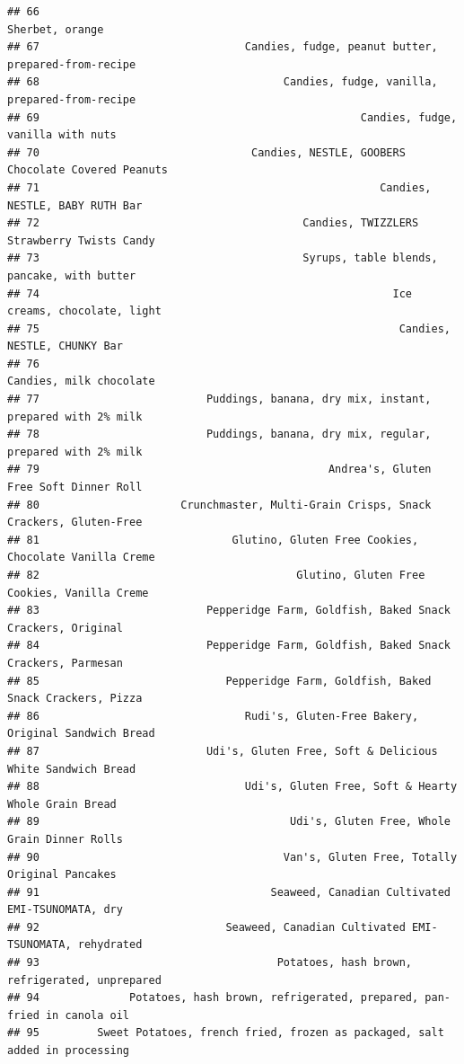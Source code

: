 \documentclass[
]{article}
\begin{document}
\begin{verbatim}
## 66                                                                    Sherbet, orange
## 67                                Candies, fudge, peanut butter, prepared-from-recipe
## 68                                      Candies, fudge, vanilla, prepared-from-recipe
## 69                                                  Candies, fudge, vanilla with nuts
## 70                                 Candies, NESTLE, GOOBERS Chocolate Covered Peanuts
## 71                                                     Candies, NESTLE, BABY RUTH Bar
## 72                                         Candies, TWIZZLERS Strawberry Twists Candy
## 73                                         Syrups, table blends, pancake, with butter
## 74                                                       Ice creams, chocolate, light
## 75                                                        Candies, NESTLE, CHUNKY Bar
## 76                                                            Candies, milk chocolate
## 77                          Puddings, banana, dry mix, instant, prepared with 2% milk
## 78                          Puddings, banana, dry mix, regular, prepared with 2% milk
## 79                                             Andrea's, Gluten Free Soft Dinner Roll
## 80                      Crunchmaster, Multi-Grain Crisps, Snack Crackers, Gluten-Free
## 81                              Glutino, Gluten Free Cookies, Chocolate Vanilla Creme
## 82                                        Glutino, Gluten Free Cookies, Vanilla Creme
## 83                          Pepperidge Farm, Goldfish, Baked Snack Crackers, Original
## 84                          Pepperidge Farm, Goldfish, Baked Snack Crackers, Parmesan
## 85                             Pepperidge Farm, Goldfish, Baked Snack Crackers, Pizza
## 86                                Rudi's, Gluten-Free Bakery, Original Sandwich Bread
## 87                          Udi's, Gluten Free, Soft & Delicious White Sandwich Bread
## 88                                Udi's, Gluten Free, Soft & Hearty Whole Grain Bread
## 89                                       Udi's, Gluten Free, Whole Grain Dinner Rolls
## 90                                      Van's, Gluten Free, Totally Original Pancakes
## 91                                    Seaweed, Canadian Cultivated EMI-TSUNOMATA, dry
## 92                             Seaweed, Canadian Cultivated EMI-TSUNOMATA, rehydrated
## 93                                     Potatoes, hash brown, refrigerated, unprepared
## 94              Potatoes, hash brown, refrigerated, prepared, pan-fried in canola oil
## 95         Sweet Potatoes, french fried, frozen as packaged, salt added in processing

\end{verbatim}
\end{document}
